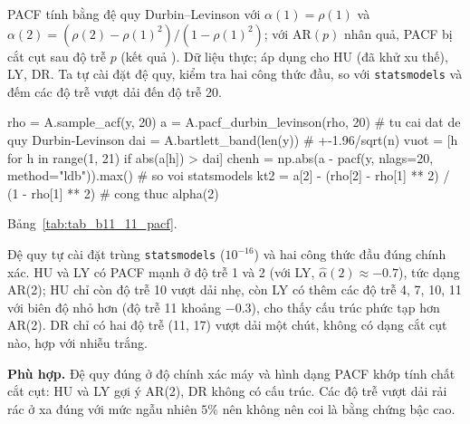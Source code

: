  PACF tính bằng đệ quy Durbin--Levinson với $\alpha(1)=\rho(1)$ và $\alpha(2)=(\rho(2)-\rho(1)^2)/(1-\rho(1)^2)$; với AR$(p)$ nhân quả, PACF bị cắt cụt sau độ trễ $p$ (kết quả ).
 Dữ liệu thực; áp dụng cho HU (đã khử xu thế), LY, DR. Ta tự cài đặt đệ quy, kiểm tra hai công thức đầu, so với \texttt{statsmodels} và đếm các độ trễ vượt dải đến độ trễ 20.
\begin{codeblock}
rho = A.sample_acf(y, 20)
a = A.pacf_durbin_levinson(rho, 20)            # tu cai dat de quy Durbin-Levinson
dai = A.bartlett_band(len(y))                  # +-1.96/sqrt(n)
vuot = [h for h in range(1, 21) if abs(a[h]) > dai]
chenh = np.abs(a - pacf(y, nlags=20, method="ldb")).max()    # so voi statsmodels
kt2 = a[2] - (rho[2] - rho[1] ** 2) / (1 - rho[1] ** 2)       # cong thuc alpha(2)
\end{codeblock}
 Bảng~\ref{tab:tab_b11_11_pacf}.

 Đệ quy tự cài đặt trùng \texttt{statsmodels} ($10^{-16}$) và hai công thức đầu đúng chính xác. HU và LY có PACF mạnh ở độ trễ 1 và 2 (với LY, $\hat\alpha(2)\approx-0.7$), tức dạng AR(2); HU chỉ còn độ trễ 10 vượt dải nhẹ, còn LY có thêm các độ trễ 4, 7, 10, 11 với biên độ nhỏ hơn (độ trễ 11 khoảng $-0.3$), cho thấy cấu trúc phức tạp hơn AR(2). DR chỉ có hai độ trễ (11, 17) vượt dải một chút, không có dạng cắt cụt nào, hợp với nhiễu trắng.

 \textbf{Phù hợp.} Đệ quy đúng ở độ chính xác máy và hình dạng PACF khớp tính chất cắt cụt: HU và LY gợi ý AR(2), DR không có cấu trúc. Các độ trễ vượt dải rải rác ở xa đúng với mức ngẫu nhiên $5\%$ nên không nên coi là bằng chứng bậc cao.


